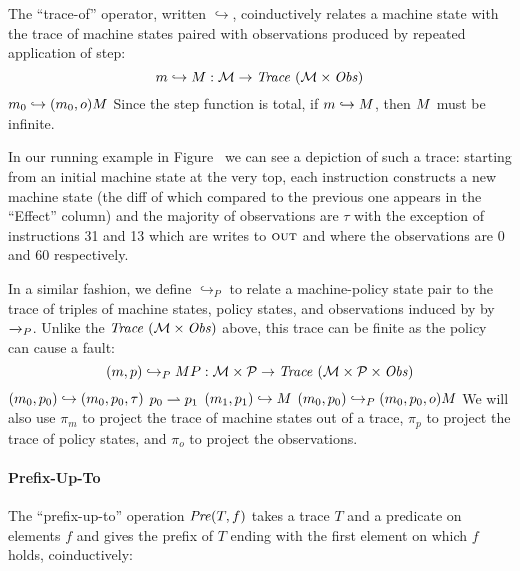 \documentclass[acmsmall,review,anonymous]{acmart}\settopmatter{printfolios=true,printccs=false,printacmref=false}
\begin{document}
The ``trace-of'' operator, written \(\hookrightarrow\), coinductively
relates a machine state with the trace of machine states paired with
observations produced by repeated application of step:
%
\[m \hookrightarrow M : {\mathcal M} \rightarrow \mathit{Trace}~({\mathcal M} \times \mathit{Obs})\]%
%
            {\(m_0 \hookrightarrow (m_0,o) M\)}%
%
\noindent
Since the step function is total, if \(m \hookrightarrow M\),
then \(M\) must be infinite.

In our running example in Figure~ we can
see a depiction of such a trace: starting from an initial machine
state at the very top, each instruction constructs a new machine state
(the diff of which compared to the previous one appears in the
``Effect'' column) and the majority of observations are $\tau$ with
the exception of instructions 31 and 13 which are writes to $\textsc{out}$
and where the observations are $0$ and $60$ respectively.

In a similar fashion, we define \(\hookrightarrow_P\) to relate a
machine-policy state pair to the trace of triples of machine states,
policy states, and observations induced by by \(\xrightarrow{}_P\).
Unlike the $\mathit{Trace}~({\mathcal M} \times \mathit{Obs})$ above, this trace can be finite as the
policy can cause a fault:
%
\[(m,p) \hookrightarrow_P MP : {\mathcal M} \times \mathcal{P} \rightarrow \mathit{Trace}~({\mathcal M} \times \mathcal{P} \times \mathit{Obs}) \]
%
         {\((m_0,p_0) \hookrightarrow (m_0,p_0,\tau)\)}
%
              {\(p_0 \rightharpoonup p_1\)}
              {\((m_1,p_1) \hookrightarrow M\)}
              {\((m_0,p_0) \hookrightarrow_P (m_0,p_0,o) M\)}
We will also use \(\pi_m\) to project the trace of machine states
out of a trace, \(\pi_p\) to project the trace of policy states, and
\(\pi_o\) to project the observations.  

\paragraph*{Prefix-Up-To}
The ``prefix-up-to'' operation \(\mathit{Pre}(T,f)\)   takes a trace \(T\) and a predicate on
elements \(f\) and gives the prefix of \(T\) ending with the first
element on which \(f\) holds, coinductively:
\end{document}
